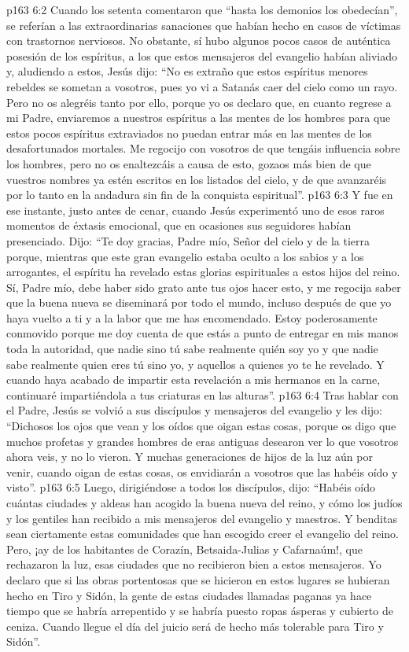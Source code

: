 \vs p163 6:2 Cuando los setenta comentaron que “hasta los demonios los obedecían”, se referían a las extraordinarias sanaciones que habían hecho en casos de víctimas con trastornos nerviosos. No obstante, sí hubo algunos pocos casos de auténtica posesión de los espíritus, a los que estos mensajeros del evangelio habían aliviado y, aludiendo a estos, Jesús dijo: “No es extraño que estos espíritus menores rebeldes se sometan a vosotros, pues yo vi a Satanás caer del cielo como un rayo. Pero no os alegréis tanto por ello, porque yo os declaro que, en cuanto regrese a mi Padre, enviaremos a nuestros espíritus a las mentes de los hombres para que estos pocos espíritus extraviados no puedan entrar más en las mentes de los desafortunados mortales. Me regocijo con vosotros de que tengáis influencia sobre los hombres, pero no os enaltezcáis a causa de esto, gozaos más bien de que vuestros nombres ya estén escritos en los listados del cielo, y de que avanzaréis por lo tanto en la andadura sin fin de la conquista espiritual”.
\vs p163 6:3 Y fue en ese instante, justo antes de cenar, cuando Jesús experimentó uno de esos raros momentos de éxtasis emocional, que en ocasiones sus seguidores habían presenciado. Dijo: “Te doy gracias, Padre mío, Señor del cielo y de la tierra porque, mientras que este gran evangelio estaba oculto a los sabios y a los arrogantes, el espíritu ha revelado estas glorias espirituales a estos hijos del reino. Sí, Padre mío, debe haber sido grato ante tus ojos hacer esto, y me regocija saber que la buena nueva se diseminará por todo el mundo, incluso después de que yo haya vuelto a ti y a la labor que me has encomendado. Estoy poderosamente conmovido porque me doy cuenta de que estás a punto de entregar en mis manos toda la autoridad, que nadie sino tú sabe realmente quién soy yo y que nadie sabe realmente quien eres tú sino yo, y aquellos a quienes yo te he revelado. Y cuando haya acabado de impartir esta revelación a mis hermanos en la carne, continuaré impartiéndola a tus criaturas en las alturas”.
\vs p163 6:4 Tras hablar con el Padre, Jesús se volvió a sus discípulos y mensajeros del evangelio y les dijo: “Dichosos los ojos que vean y los oídos que oigan estas cosas, porque os digo que muchos profetas y grandes hombres de eras antiguas desearon ver lo que vosotros ahora veis, y no lo vieron. Y muchas generaciones de hijos de la luz aún por venir, cuando oigan de estas cosas, os envidiarán a vosotros que las habéis oído y visto”.
\vs p163 6:5 Luego, dirigiéndose a todos los discípulos, dijo: “Habéis oído cuántas ciudades y aldeas han acogido la buena nueva del reino, y cómo los judíos y los gentiles han recibido a mis mensajeros del evangelio y maestros. Y benditas sean ciertamente estas comunidades que han escogido creer el evangelio del reino. Pero, ¡ay de los habitantes de Corazín, Betsaida\hyp{}Julias y Cafarnaúm!, que rechazaron la luz, esas ciudades que no recibieron bien a estos mensajeros. Yo declaro que si las obras portentosas que se hicieron en estos lugares se hubieran hecho en Tiro y Sidón, la gente de estas ciudades llamadas paganas ya hace tiempo que se habría arrepentido y se habría puesto ropas ásperas y cubierto de ceniza. Cuando llegue el día del juicio será de hecho más tolerable para Tiro y Sidón”.
